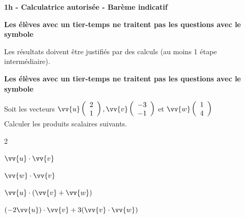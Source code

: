 \documentclass[12pt,a4paper]{article}  %
\begin{document}
\graphicspath{{../../images/}}

\begin{center}

\end{center}


\begin{center}\textbf{1h - Calculatrice autorisée - Barème indicatif}\end{center}

\begin{center}\textbf{Les élèves avec un tier-temps ne traitent pas les questions avec  le symbole }\end{center}

\begin{center}
Les résultats doivent être justifiés par des calculs (au moins 1 étape intermédiaire).
\end{center}

\begin{center}\textbf{Les élèves avec un tier-temps ne traitent pas les questions avec  le symbole }\end{center}

Soit les vecteurs $\vv{u}\left(\begin{array}{l}2 \\ 1\end{array}\right), \vv{v}\left(\begin{array}{c}-3 \\ -1\end{array}\right)$ et $\vv{w}\left(\begin{array}{l}1 \\ 4\end{array}\right)$\\
Calculer les produits scalaires suivants.
\begin{multicols}{2}
\begin{enumMet}
    \item $\vv{u} \cdot \vv{v}$
    \item $\vv{w} \cdot \vv{v}$
    \item {} $\vv{u} \cdot(\vv{v}+\vv{w})$
    \item $(-2 \vv{u}) \cdot \vv{v}+3(\vv{v} \cdot \vv{w})$
\end{enumMet}
\end{multicols}
\end{document}
